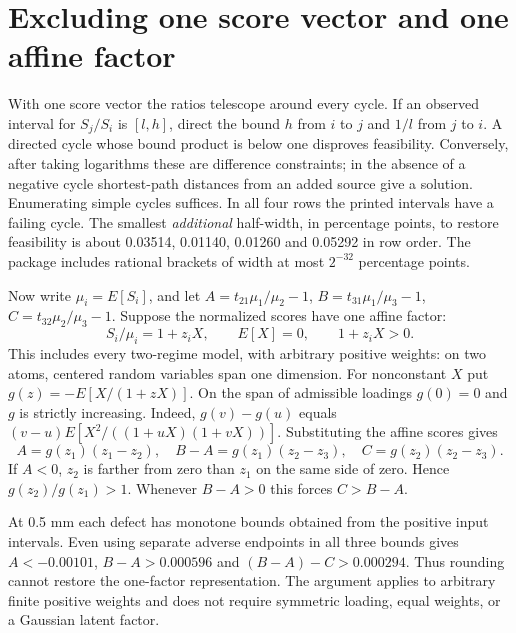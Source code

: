 \documentclass[11pt]{article}
\begin{document}
\section{Excluding one score vector and one affine factor}
With one score vector the ratios telescope around every cycle. If an observed interval for $S_j/S_i$ is $[l,h]$, direct the bound $h$ from $i$ to $j$ and $1/l$ from $j$ to $i$. A directed cycle whose bound product is below one disproves feasibility. Conversely, after taking logarithms these are difference constraints; in the absence of a negative cycle shortest-path distances from an added source give a solution. Enumerating simple cycles suffices. In all four rows the printed intervals have a failing cycle. The smallest \emph{additional} half-width, in percentage points, to restore feasibility is about 0.03514, 0.01140, 0.01260 and 0.05292 in row order. The package includes rational brackets of width at most $2^{-32}$ percentage points.

Now write $\mu_i=E[S_i]$, and let $A=t_{21}\mu_1/\mu_2-1$, $B=t_{31}\mu_1/\mu_3-1$, $C=t_{32}\mu_2/\mu_3-1$. Suppose the normalized scores have one affine factor:
\[
 S_i/\mu_i=1+z_i X,\qquad E[X]=0,\qquad 1+z_i X>0.
\]
This includes every two-regime model, with arbitrary positive weights: on two atoms, centered random variables span one dimension. For nonconstant $X$ put $g(z)=-E[X/(1+zX)]$. On the span of admissible loadings $g(0)=0$ and $g$ is strictly increasing. Indeed, $g(v)-g(u)$ equals $(v-u)E[X^2/((1+uX)(1+vX))]$. Substituting the affine scores gives
\[
 A=g(z_1)(z_1-z_2),\quad B-A=g(z_1)(z_2-z_3),\quad
 C=g(z_2)(z_2-z_3).
\]
If $A<0$, $z_2$ is farther from zero than $z_1$ on the same side of zero. Hence $g(z_2)/g(z_1)>1$. Whenever $B-A>0$ this forces $C>B-A$.

At 0.5 mm each defect has monotone bounds obtained from the positive input intervals. Even using separate adverse endpoints in all three bounds gives $A<-0.00101$, $B-A>0.000596$ and $(B-A)-C>0.000294$. Thus rounding cannot restore the one-factor representation. The argument applies to arbitrary finite positive weights and does not require symmetric loading, equal weights, or a Gaussian latent factor.
\end{document}
